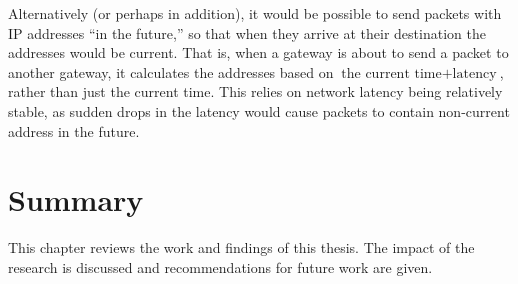 \par Alternatively (or perhaps in addition), it would be possible to send packets with \ac{IP} addresses ``in the future,'' so that when they arrive at their destination the addresses would be current. That is, when a gateway is about to send a packet to another gateway, it calculates the addresses based on $\text{the current time} + \text{latency}$, rather than just the current time. This relies on network latency being relatively stable, as sudden drops in the latency would cause packets to contain non-current address in the future. 

\section{Summary}
\par This chapter reviews the work and findings of this thesis. The impact of the research is discussed and recommendations for future work are given.

